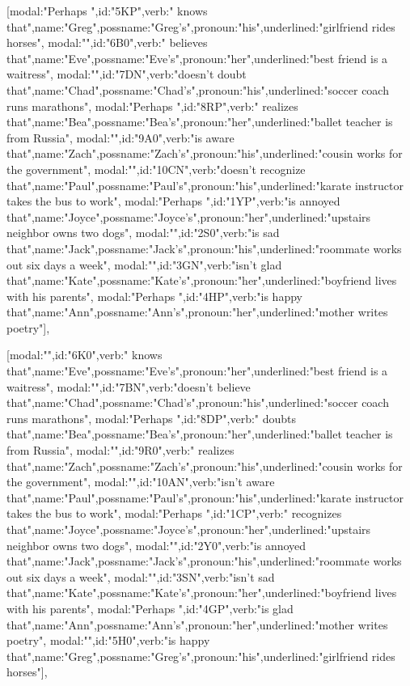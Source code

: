 [{modal:"Perhaps ",id:"5KP",verb:" knows that",name:"Greg",possname:"Greg's",pronoun:"his",underlined:"girlfriend rides horses"},
{modal:"",id:"6B0",verb:" believes that",name:"Eve",possname:"Eve's",pronoun:"her",underlined:"best friend is a waitress"},
{modal:"",id:"7DN",verb:"doesn't doubt that",name:"Chad",possname:"Chad's",pronoun:"his",underlined:"soccer coach runs marathons"},
{modal:"Perhaps ",id:"8RP",verb:" realizes that",name:"Bea",possname:"Bea's",pronoun:"her",underlined:"ballet teacher is from Russia"},
{modal:"",id:"9A0",verb:"is aware that",name:"Zach",possname:"Zach's",pronoun:"his",underlined:"cousin works for the government"},
{modal:"",id:"10CN",verb:"doesn't recognize that",name:"Paul",possname:"Paul's",pronoun:"his",underlined:"karate instructor takes the bus to work"},
{modal:"Perhaps ",id:"1YP",verb:"is annoyed that",name:"Joyce",possname:"Joyce's",pronoun:"her",underlined:"upstairs neighbor owns two dogs"},
{modal:"",id:"2S0",verb:"is sad that",name:"Jack",possname:"Jack's",pronoun:"his",underlined:"roommate works out six days a week"},
{modal:"",id:"3GN",verb:"isn't glad that",name:"Kate",possname:"Kate's",pronoun:"her",underlined:"boyfriend lives with his parents"},
{modal:"Perhaps ",id:"4HP",verb:"is happy that",name:"Ann",possname:"Ann's",pronoun:"her",underlined:"mother writes poetry"}],

[{modal:"",id:"6K0",verb:" knows that",name:"Eve",possname:"Eve's",pronoun:"her",underlined:"best friend is a waitress"},
{modal:"",id:"7BN",verb:"doesn't believe that",name:"Chad",possname:"Chad's",pronoun:"his",underlined:"soccer coach runs marathons"},
{modal:"Perhaps ",id:"8DP",verb:" doubts that",name:"Bea",possname:"Bea's",pronoun:"her",underlined:"ballet teacher is from Russia"},
{modal:"",id:"9R0",verb:" realizes that",name:"Zach",possname:"Zach's",pronoun:"his",underlined:"cousin works for the government"},
{modal:"",id:"10AN",verb:"isn't aware that",name:"Paul",possname:"Paul's",pronoun:"his",underlined:"karate instructor takes the bus to work"},
{modal:"Perhaps ",id:"1CP",verb:" recognizes that",name:"Joyce",possname:"Joyce's",pronoun:"her",underlined:"upstairs neighbor owns two dogs"},
{modal:"",id:"2Y0",verb:"is annoyed that",name:"Jack",possname:"Jack's",pronoun:"his",underlined:"roommate works out six days a week"},
{modal:"",id:"3SN",verb:"isn't sad that",name:"Kate",possname:"Kate's",pronoun:"her",underlined:"boyfriend lives with his parents"},
{modal:"Perhaps ",id:"4GP",verb:"is glad that",name:"Ann",possname:"Ann's",pronoun:"her",underlined:"mother writes poetry"},
{modal:"",id:"5H0",verb:"is happy that",name:"Greg",possname:"Greg's",pronoun:"his",underlined:"girlfriend rides horses"}],

